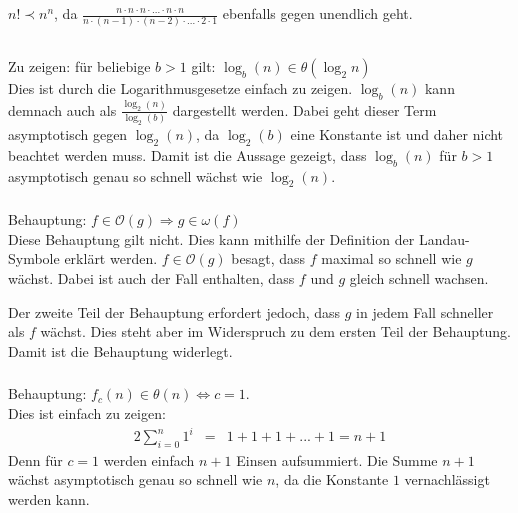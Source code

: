 \documentclass[10pt,a4paper,oneside,ngerman,numbers=noenddot]{scrartcl}
\begin{document}
	$n! \prec n^{n}$, da $\frac{n \cdot n \cdot n \cdot ... \cdot n \cdot n}{n \cdot (n-1) \cdot (n-2) \cdot ... \cdot 2 \cdot 1}$ ebenfalls gegen unendlich geht.
	\subsection{} %
		\subsubsection{} %
		Zu zeigen: für beliebige $b > 1$ gilt: $\log_{b}(n) \in \mathcal{\theta} (\log_{2}n)$\\
		Dies ist durch die Logarithmusgesetze einfach zu zeigen. $\log_{b}(n)$ kann demnach auch als $\frac{\log_{2}(n)}{\log_{2}(b)}$ dargestellt werden. Dabei geht dieser Term asymptotisch gegen $\log_{2}(n)$, da $\log_{2}(b)$ eine Konstante ist und daher nicht beachtet werden muss. Damit ist die Aussage gezeigt, dass $\log_{b}(n)$ für $b > 1$ asymptotisch genau so schnell wächst wie $\log_{2}(n)$.
		\subsubsection{} %
		Behauptung: $f \in \mathcal{O}(g) \Rightarrow g \in \omega (f)$\\
		Diese Behauptung gilt nicht. Dies kann mithilfe der Definition der Landau-Symbole erklärt werden. $f \in \mathcal{O}(g)$ besagt, dass $f$ maximal so schnell wie $g$ wächst. Dabei ist auch der Fall enthalten, dass $f$ und $g$ gleich schnell wachsen.
		
		Der zweite Teil der Behauptung erfordert jedoch, dass $g$ in jedem Fall schneller als $f$ wächst. Dies steht aber im Widerspruch zu dem ersten Teil der Behauptung. Damit ist die Behauptung widerlegt. 
		\subsubsection{} %
		Behauptung: $f_{c}(n) \in \theta(n) \Leftrightarrow c = 1$.\\
		Dies ist einfach zu zeigen:\\
		\begin{alignat*}{2}
		\sum\limits_{i=0}^{n} 1^{i} &=& 1 + 1 + 1 + ... + 1 = n + 1
		\end{alignat*}
		Denn für $c=1$ werden einfach $n+1$ Einsen aufsummiert. Die Summe $n+1$ wächst asymptotisch genau so schnell wie $n$, da die Konstante $1$ vernachlässigt werden kann.
		
\section{} %
\end{document}
